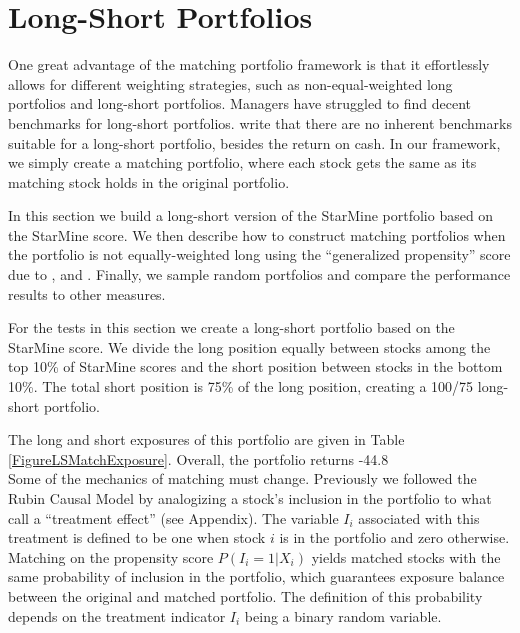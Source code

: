 \documentclass{article}\usepackage{graphicx, color}
\begin{document}
\section{Long-Short Portfolios}

One great advantage of the matching portfolio framework is that it
effortlessly allows for different weighting strategies, such as
non-equal-weighted long portfolios and long-short
portfolios. Managers have struggled to find decent
benchmarks for long-short portfolios. \cite{jacobs99} write that there
are no inherent benchmarks suitable for a long-short portfolio,
besides the return on cash. In our framework, we simply create a
matching portfolio, where each stock gets the same as its matching
stock holds in the original portfolio.

In this section we build a long-short version of the StarMine
portfolio based on the StarMine score. We then describe how to
construct matching portfolios when the portfolio is not
equally-weighted long using the ``generalized propensity'' score due to
\cite{imai04}, \cite{hirano04} and \cite{lu01}. Finally, we sample
random portfolios and compare the performance results to other
measures.




For the tests in this section we create a long-short portfolio
based on the StarMine score. We divide the long position equally between
stocks among the top 10\% of StarMine scores and the short position
between stocks in the bottom 10\%. The total short position is 75\% of
the long position, creating a 100/75 long-short portfolio.

The long and short exposures of this portfolio are given in Table
\ref{FigureLSMatchExposure}. Overall, the portfolio returns
-44.8\\%




Some of the mechanics of matching must change. Previously we followed
the Rubin Causal Model by analogizing a stock's inclusion in the
portfolio to what \cite{rosenbaum83} call a ``treatment effect'' (see
Appendix). The variable $I_i$ associated with this treatment is
defined to be one when stock $i$ is in the portfolio and zero
otherwise. Matching on the propensity score $P(I_i = 1 | X_i)$ yields
matched stocks with the same probability of inclusion in the
portfolio, which guarantees exposure balance between the original and
matched portfolio. The definition of this probability depends on
the treatment indicator $I_i$ being a binary random variable.
\end{document}
